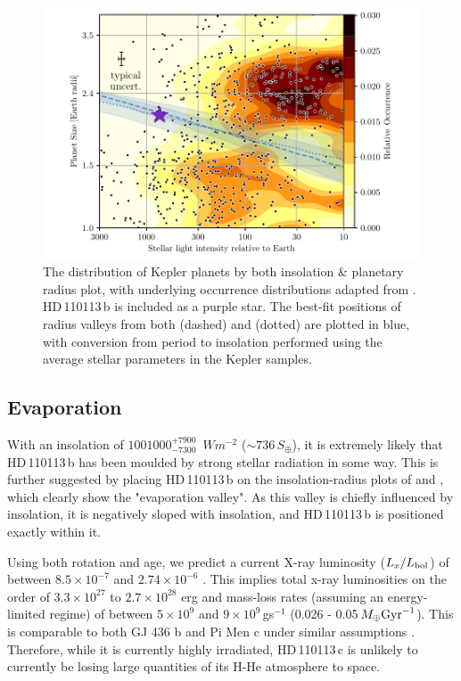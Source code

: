 \documentclass[fleqn,usenatbib]{mnras}
\newcommand{\TSin}{ $ 1001000^{+7900}_{-7300} $ }
\newcommand{\Tplanet}{HD\,110113\,b}
\newcommand{\Tplanetc}{HD\,110113\,c}
\begin{document}
\begin{figure}
	\includegraphics[width=\columnwidth, trim={0.8cm 0.5cm 1.05cm 0.2cm}]{Insolation_TOI755}
    \caption{The distribution of Kepler planets by both insolation \& planetary radius plot, with underlying occurrence distributions adapted from \citep{martinez2019spectroscopic}. \Tplanet{} is included as a purple star. The best-fit positions of radius valleys from both \citet{martinez2019spectroscopic} (dashed) and \citet{van2018asteroseismic} (dotted) are plotted in blue, with conversion from period to insolation performed using the average stellar parameters in the Kepler samples.\label{fig:MR_Diagram}
    }
\end{figure}

\subsection{Evaporation}\label{sect:evap}
With an insolation of \TSin{}\,$Wm^{-2}$ ($\sim736\,S_\oplus$), it is extremely likely that \Tplanet{} has been moulded by strong stellar radiation in some way.
This is further suggested by placing \Tplanet{} on the insolation-radius plots of \citet{fulton2017california} and \citet{martinez2019spectroscopic}, which clearly show the "evaporation valley".
As this valley is chiefly influenced by insolation, it is negatively sloped with insolation, and \Tplanet{} is positioned exactly within it.

Using both rotation and age, we predict a current X-ray luminosity ($L_x/L_{\rm bol}$) of between $8.5\times10^{-7}$ \citep[with Prot;][]{wright2018stellar} and $2.74\times10^{-6}$ \citep[with age;][]{jackson2012coronal}.
This implies total x-ray luminosities on the order of $3.3\times10^{27}$ to $2.7\times10^{28}$ erg and mass-loss rates (assuming an energy-limited regime) of between $5\times10^{9}$ and $9\times10^{9}$\,gs$^{-1}$ (0.026 - 0.05\,$M_\oplus {\rm Gyr}^{-1}$).
This is comparable to both GJ 436 b and Pi Men c under similar assumptions \citep{king2019xuv}.
Therefore, while it is currently highly irradiated, \Tplanetc{} is unlikely to currently be losing large quantities of its H-He atmosphere to space.
\end{document}
